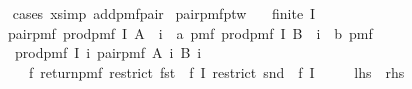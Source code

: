 \begin{isabellebody}
%
\isadelimproof
\ \ %
\endisadelimproof
%
\isatagproof
{}\isamarkupfalse%
\ {\isacharparenleft}{\kern0pt}cases\ x{\isacharcomma}{\kern0pt}simp\ add{\isacharcolon}{\kern0pt}pmf{\isacharunderscore}{\kern0pt}pair{\isacharparenright}{\kern0pt}%
\endisatagproof
{\isafoldproof}%
%
\isadelimproof
\isanewline
%
\endisadelimproof
\isanewline
{}\isamarkupfalse%
\ pair{\isacharunderscore}{\kern0pt}pmf{\isacharunderscore}{\kern0pt}ptw{\isacharcolon}{\kern0pt}\isanewline
\ \ \ {\isachardoublequoteopen}finite\ I{\isachardoublequoteclose}\isanewline
\ \ \ {\isachardoublequoteopen}pair{\isacharunderscore}{\kern0pt}pmf\ {\isacharparenleft}{\kern0pt}prod{\isacharunderscore}{\kern0pt}pmf\ I\ A\ {\isacharcolon}{\kern0pt}{\isacharcolon}{\kern0pt}\ {\isacharparenleft}{\kern0pt}{\isacharparenleft}{\kern0pt}{\isacharprime}{\kern0pt}i\ {\isasymRightarrow}\ {\isacharprime}{\kern0pt}a{\isacharparenright}{\kern0pt}\ pmf{\isacharparenright}{\kern0pt}{\isacharparenright}{\kern0pt}\ {\isacharparenleft}{\kern0pt}prod{\isacharunderscore}{\kern0pt}pmf\ I\ B\ {\isacharcolon}{\kern0pt}{\isacharcolon}{\kern0pt}\ {\isacharparenleft}{\kern0pt}{\isacharparenleft}{\kern0pt}{\isacharprime}{\kern0pt}i\ {\isasymRightarrow}\ {\isacharprime}{\kern0pt}b{\isacharparenright}{\kern0pt}\ pmf{\isacharparenright}{\kern0pt}{\isacharparenright}{\kern0pt}\ {\isacharequal}{\kern0pt}\ \isanewline
\ \ \ \ prod{\isacharunderscore}{\kern0pt}pmf\ I\ {\isacharparenleft}{\kern0pt}{\isasymlambda}i{\isachardot}{\kern0pt}\ pair{\isacharunderscore}{\kern0pt}pmf\ {\isacharparenleft}{\kern0pt}A\ i{\isacharparenright}{\kern0pt}\ {\isacharparenleft}{\kern0pt}B\ i{\isacharparenright}{\kern0pt}{\isacharparenright}{\kern0pt}\ {\isasymbind}\ \isanewline
\ \ \ \ \ \ {\isacharparenleft}{\kern0pt}{\isasymlambda}f{\isachardot}{\kern0pt}\ return{\isacharunderscore}{\kern0pt}pmf\ {\isacharparenleft}{\kern0pt}restrict\ {\isacharparenleft}{\kern0pt}fst\ {\isasymcirc}\ f{\isacharparenright}{\kern0pt}\ I{\isacharcomma}{\kern0pt}\ restrict\ {\isacharparenleft}{\kern0pt}snd\ {\isasymcirc}\ f{\isacharparenright}{\kern0pt}\ I{\isacharparenright}{\kern0pt}{\isacharparenright}{\kern0pt}{\isachardoublequoteclose}\isanewline
\ \ \ \ {\isacharparenleft}{\kern0pt}\ {\isachardoublequoteopen}{\isacharquery}{\kern0pt}lhs\ {\isacharequal}{\kern0pt}\ {\isacharquery}{\kern0pt}rhs{\isachardoublequoteclose}{\isacharparenright}{\kern0pt}\isanewline
%
\isadelimproof
%
\endisadelimproof
%
\isatagproof
{}\isamarkupfalse%
\ {\isacharminus}{\kern0pt}\isanewline
\ \ \isamarkupfalse%

\end{isabellebody}
